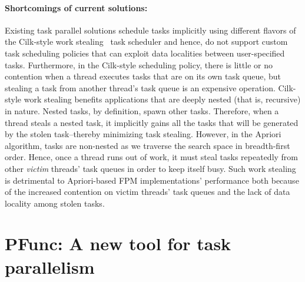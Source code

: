 \documentclass{IOS-Book-Article}
\begin{document}
\paragraph{Shortcomings of current solutions:}
Existing task parallel solutions schedule tasks implicitly using different
flavors of the Cilk-style work stealing~\cite{Blumofe94} task scheduler and
hence, do not support custom task scheduling policies that can exploit data
localities between user-specified tasks. Furthermore, in the
Cilk-style scheduling policy, there is little or no
contention when a thread executes tasks that are on its own task queue, but stealing
a task from another thread's task queue is an expensive operation.  Cilk-style
work stealing benefits applications that are deeply nested (that is, recursive) in
nature. Nested tasks, by definition, spawn other tasks. Therefore, when a
thread steals a nested task, it implicitly gains all the tasks that will be
generated by the stolen task--thereby minimizing task stealing.  However, in
the Apriori algorithm, tasks are non-nested as we traverse the search space in
breadth-first order. Hence, once a thread runs out of work, it must steal tasks
repeatedly from other \textit{victim} threads' task queues in order to keep
itself busy.  Such work stealing is detrimental to Apriori-based FPM
implementations' performance both because of the increased contention on victim
threads' task queues and the lack of data locality among stolen tasks.

\section{PFunc: A new tool for task parallelism}
\label{sec:pfunc}
\end{document}
